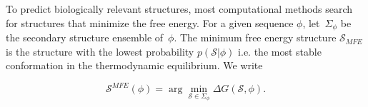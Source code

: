 \begin{mydef}
	\label{def:mfe}
	
	To predict biologically relevant structures, most computational methods search for structures that minimize the free energy. For a given sequence $\phi$, let~\(\Sigma_{\phi}\) be the secondary structure ensemble of~\(\phi\). The minimum free energy structure $\mathcal{S}_{MFE}$ is the structure with the lowest probability $p(\mathcal{S}|\phi)$ i.e. the  most stable conformation in the thermodynamic equilibrium. We write
	
	\begin{equation}
	\mathcal{S}^{MFE}(\phi) = \arg \min_{\mathcal{S} \in \Sigma_{\phi}} \Delta G(\mathcal{S}, \phi).
	\end{equation}
	
\end{mydef}

